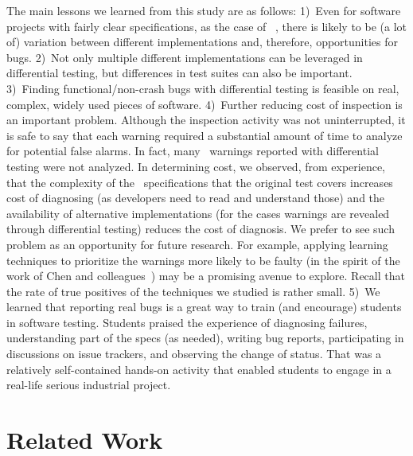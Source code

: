 \documentclass[sigconf,review, anonymous]{acmart}
\begin{document}
The main lessons we learned from this study are as follows: 1)~Even
for software projects with fairly clear specifications, as the case of
\javascript{}~\cite{ecmas262-spec}, there is likely to be (a lot of)
variation between different implementations and, therefore,
opportunities for bugs. 2)~Not only multiple different implementations
can be leveraged in differential testing, but differences in test
suites can also be important. 3)~Finding functional/non-crash bugs
with differential testing is feasible on real, complex, widely used
pieces of software. 4)~Further reducing cost of inspection is an
important problem. Although the inspection activity was not
uninterrupted, it is safe to say that each warning required a
substantial amount of time to analyze for potential false alarms. In
fact, many \hi\ warnings reported with differential testing were not
analyzed. In determining cost, we observed, from experience, that the
complexity of the \js\ specifications that the original test covers
increases cost of diagnosing (as developers need to read and
understand those) and the availability of alternative implementations
(for the cases warnings are revealed through differential testing)
reduces the cost of diagnosis. We prefer to see such problem as an
opportunity for future research. For example, applying learning
techniques to prioritize the warnings more likely to be faulty (in the
spirit of the work of Chen and
colleagues~\cite{Chen:2017:LPT:3097368.3097451}) may be a promising
avenue to explore. Recall that the rate of true positives of the
techniques we studied is rather small.  5)~We learned that reporting
real bugs is a great way to train (and encourage) students in software
testing. Students praised the experience of diagnosing failures,
understanding part of the specs (as needed), writing bug reports,
participating in discussions on issue trackers, and observing the
change of status. That was a relatively self-contained hands-on
activity that enabled students to engage in a real-life serious
industrial project.

\section{Related Work}
\label{sec:related-work}
\end{document}
